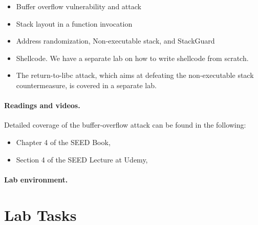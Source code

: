 \begin{itemize}[noitemsep]
\item Buffer overflow vulnerability and attack
\item Stack layout in a function invocation
\item Address randomization, Non-executable stack, and  StackGuard
\item Shellcode. We have a separate lab on how to write shellcode 
from scratch.
\item The return-to-libc attack, which aims at 
defeating the non-executable stack countermeasure, is covered 
in a separate lab.
\end{itemize}


\noindent
{}



\paragraph{Readings and videos.}
Detailed coverage of the buffer-overflow attack can be found in the following:

\begin{itemize}
\item Chapter 4 of the SEED Book, \seedbook
\item Section 4 of the SEED Lecture at Udemy, \seedcsvideo
\end{itemize}


\paragraph{Lab environment.} \seedenvironment



\newpage
\section{Lab Tasks}

